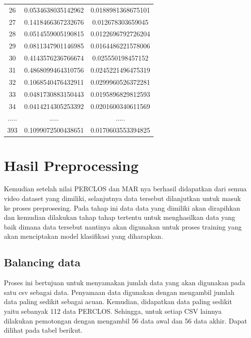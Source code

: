 \begin{longtable}{|c|c|c|}
  26    & 0.0534638035142962 & 0.0188981368675101 \\
  27    & 0.1418466367232676 & 0.012678303659045  \\
  28    & 0.0514559005190815 & 0.0122696792726204 \\
  29    & 0.0811347901146985 & 0.0164486221578006 \\
  30    & 0.4143576236766674 & 0.025550198457152  \\
  31    & 0.4868099464310756 & 0.0245221496475319 \\
  32    & 0.1068540476432911 & 0.0299960526372281 \\
  33    & 0.0481730883150443 & 0.0195896829812593 \\
  34    & 0.0414214305253392 & 0.0201600340611569 \\
  ..... & .....              & .....              \\
  393   & 0.1099072500438651 & 0.0170603553394825 \\

  \hline
\end{longtable}


\section{Hasil Preprocessing}
\label{sec:skenariopengujian}

Kemudian setelah nilai PERCLOS dan MAR nya berhasil didapatkan dari semua video dataset yang dimiliki, selanjutnya data tersebut dilanjutkan untuk masuk ke proses preprosesing. Pada tahap ini data data yang dimiliki akan dirapihkan dan kemudian dilakukan tahap tahap tertentu untuk menghasilkan data yang baik dimana data tersebut nantinya akan digunakan untuk proses training yang akan menciptakan model klasifikasi yang diharapkan.

\subsection{Balancing data}
Proses ini bertujuan untuk menyamakan jumlah data yang akan digunakan pada satu csv sebagai data. Penyamaan data digunakan dengan mengambil jumlah data paling sedikit sebagai acuan. Kemudian, didapatkan data paling sedikit yaitu sebanyak 112 data PERCLOS. Sehingga, untuk setiap CSV lainnya dilakukan pemotongan dengan mengambil 56 data awal dan 56 data akhir. Dapat dilihat pada tabel berikut.

